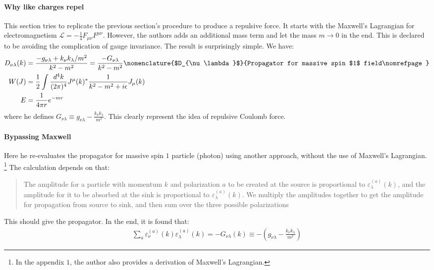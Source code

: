 \documentclass{book}
\numberwithin{equation}{subsection} %
\theoremstyle{definition}
\begin{document}
\paragraph{Why like charges repel}

This section tries to replicate the previous section's procedure to
produce a repulsive force. It starts with the Maxwell's Lagrangian for
electromagnetism $\mathcal{L}=-\frac{1}{4} F_{\mu\nu}F^{\mu\nu}$.
However, the authors adds an additional mass term and let the mass
$m\to 0$ in the end. This is declared to be avoiding the complication of
gauge invariance. The result is surprisingly simple. We have:
\begin{align}
    D_{\nu\lambda}(k)&=\frac{-g_{\nu\lambda}+k_\nu k_\lambda/m^2}
        {k^2-m^2}
        = \frac{-G_{\nu\lambda}}{k^2-m^2}
        \nomenclature{$D_{\nu\lambda}$}
            {Propagator for massive spin $1$ field\nomrefpage}
    \nonumber\\
    W(J)&=\frac{1}{2} \int \frac{d^4k}{(2\pi)^4}
        J^\mu (k)^* \frac{1}{k^2-m^2+i\epsilon} J_\mu(k)
    \nonumber\\
    E&=\frac{1}{4\pi r}e^{-mr} 
\end{align}
where he defines 
$G_{\nu\lambda}\equiv g_{\nu\lambda}-\frac{k_\nu k_\lambda}{m^2}$.
This clearly represent the idea of repulsive Coulomb force.

\paragraph{Bypassing Maxwell}

Here he re-evaluates the propagator for massive spin $1$ particle
(photon) using another approach, without the use of Maxwell's Lagrangian.
\footnote{
    In the appendix $1$, the author also provides a derivation of
    Maxwell's Lagrangian.
}
The calculation depends on that:
\begin{quote}
   The amplitude for a particle with momentum $k$ and polarization $a$
   to be created at the source is proportional to 
   $\varepsilon^{(a)}_\lambda(k)$, and the amplitude for it to be absorbed 
   at the sink is proportional to $\varepsilon^{(a)}_\lambda(k)$. We 
   multiply the amplitudes together to get the amplitude for
   propagation from source to sink, and then sum over the three 
   possible polarizations
\end{quote}
This should give the propagator. In the end, it is found that:
\begin{align}
    \sum_a \varepsilon^{(a)}_\nu(k) \varepsilon^{(a)}_\lambda(k)
    = - G_{\nu\lambda}(k) 
    \equiv - \left(g_{\nu\lambda}-\frac{k_\nu k_\lambda}{m^2}\right)
\end{align}
\end{document}
